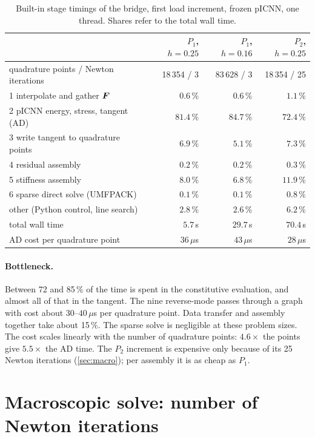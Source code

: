 \begin{table}[htbp]
\centering\small
\caption[Built-in stage timings of the bridge, first load increment]{Built-in stage timings of the bridge, first load increment, frozen pICNN, one thread. Shares refer to the total wall time.}
\label{tab:profile}
\begin{tabular}{@{}lrrr@{}}
\toprule
& $P_1$, $h=0.25$ & $P_1$, $h=0.16$ & $P_2$, $h=0.25$\\
\midrule
quadrature points / Newton iterations & 18\,354 / 3 & 83\,628 / 3 & 18\,354 / 25\\
\midrule
1 interpolate and gather $\bm F$ & $0.6\,\%$ & $0.6\,\%$ & $1.1\,\%$\\
2 pICNN energy, stress, tangent (AD) & $\mathbf{81.4\,\%}$ & $\mathbf{84.7\,\%}$ & $\mathbf{72.4\,\%}$\\
3 write tangent to quadrature points & $6.9\,\%$ & $5.1\,\%$ & $7.3\,\%$\\
4 residual assembly & $0.2\,\%$ & $0.2\,\%$ & $0.3\,\%$\\
5 stiffness assembly & $8.0\,\%$ & $6.8\,\%$ & $11.9\,\%$\\
6 sparse direct solve (UMFPACK) & $0.1\,\%$ & $0.1\,\%$ & $0.8\,\%$\\
other (Python control, line search) & $2.8\,\%$ & $2.6\,\%$ & $6.2\,\%$\\
\midrule
total wall time & $5.7\,$s & $29.7\,$s & $70.4\,$s\\
AD cost per quadrature point & $36\,\mu$s & $43\,\mu$s & $28\,\mu$s\\
\bottomrule
\end{tabular}
\end{table}

\paragraph{Bottleneck.} Between 72 and 85\,\% of the time is spent in the
constitutive evaluation, and almost all of that in the tangent. The nine
reverse-mode passes through a graph with  cost about
$30$--$40\,\mu$s per quadrature point. Data transfer and assembly together take
about 15\,\%. The sparse solve is negligible at these problem sizes. The cost
scales linearly with the number of quadrature points: $4.6\times$ the points give
$5.5\times$ the AD time. The $P_2$ increment is expensive only because of its 25
Newton iterations (\cref{sec:macro}); per assembly it is as cheap as $P_1$.

\section{Macroscopic solve: number of Newton iterations}

